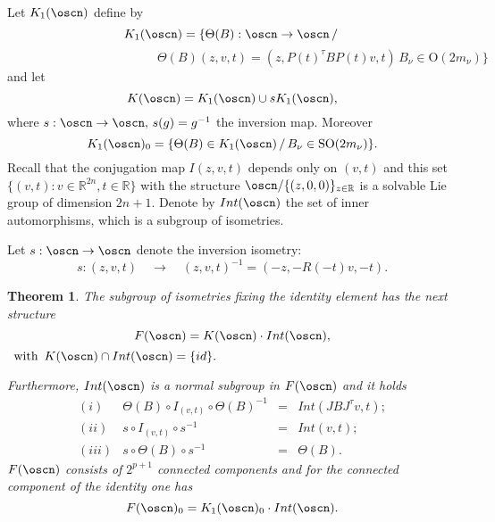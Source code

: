 \documentclass[11pt]{amsart}
\theoremstyle{plain}
\newtheorem{thm}{Theorem}[section]
\theoremstyle{definition}
\theoremstyle{remark}
\begin{document}
Let $K_1(\oscn)$ define by
$$K_1(\oscn)=\{\Theta(B):\oscn \to \oscn \,  /\,$$
$$\qquad \qquad \qquad  \qquad \qquad \qquad \Theta(B)(z,v,t)=(z,P(t)^{\tau}BP(t)v,t)\, B_{\nu}\in\mathrm{O}(2m_{\nu})\}$$
and let $$K(\oscn)=K_1(\oscn)\cup sK_1(\oscn),$$
where $s:\oscn \to \oscn, \, s(g)=g^{-1}$ the inversion map.
Moreover 
$$K_1(\oscn)_0=\{\Theta(B)\in K_1(\oscn)\,/\, B_{\nu}\in \mathrm{SO}(2m_{\nu})\}.$$
Recall that the conjugation map $I{(z,v,t)}$ depends only on $(v,t)$ and this set $\{(v,t): v \in \mathbb R^{2n}, t\in \mathbb R\}$ with the structure $\oscn/\{(z,0,0)\}_{z\in\mathbb R}$ is a solvable Lie group of dimension $2n+1$. Denote by $Int(\oscn)$ the set of inner automorphisms, which is a subgroup of isometries. 

Let $s:\oscn \to \oscn$ denote the inversion  isometry:
$$s: (z,v,t) \quad \to \quad (z,v,t)^{-1}=(-z, -R(-t)v,-t).$$

    \begin{thm}\cite{Bou} \label{Bou}
        The subgroup of isometries fixing the identity element has the next structure
        $$F(\oscn)=K(\oscn)\cdot 
       Int(\oscn),$$
       $ \, \mbox{ with  }\, K(\oscn)\cap Int(\oscn)=\{id\}.$
        
        Furthermore, $Int(\oscn)$ is a normal subgroup in $F(\oscn)$ and it holds
    $$ \begin{array}{crcl}
        	(i) & \Theta(B)\circ I_{(v,t)}\circ \Theta(B)^{-1} & = &Int(JBJ^{\tau}v,t);\\  	
        
        	(ii) & s\circ I_{(v,t)}\circ s^{-1} & = & Int(v,t);\\
        
        (iii) & s \circ \Theta(B) \circ s^{-1} &   = & \Theta(B).
        \end{array}$$
  $F(\oscn)$ consists of $2^{p+1}$ connected components and for the connected component of the identity one has
  $$F(\oscn)_0=K_1(\oscn)_0\cdot Int(\oscn).$$
        \end{thm}
\end{document}
